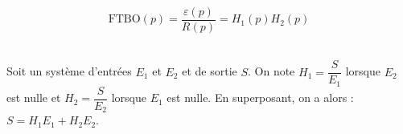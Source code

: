\documentclass[10pt,fleqn]{article} %
\begin{document}
\begin{defi} ~\\

\vspace{-.6cm}

\begin{minipage}[c]{.48\linewidth}
$$\text{FTBO}(p)=\dfrac{\varepsilon(p)}{R(p)}=H_1(p) H_2(p)$$
\end{minipage}\hfill
\begin{minipage}[c]{.48\linewidth}
\begin{center}
\end{center} 
\end{minipage}

\end{defi}

%
%
%
%
%
%
%

\begin{defi} ~\\
Soit un système d'entrées $E_1$ et $E_2$ et de sortie $S$. On note $H_1=\dfrac{S}{E_1}$ lorsque $E_2$ est nulle et $H_2=\dfrac{S}{E_2}$ lorsque $E_1$ est nulle. En superposant, on a alors : $S=H_1 E_1 + H_2 E_2$.
\end{defi}
\end{document}
